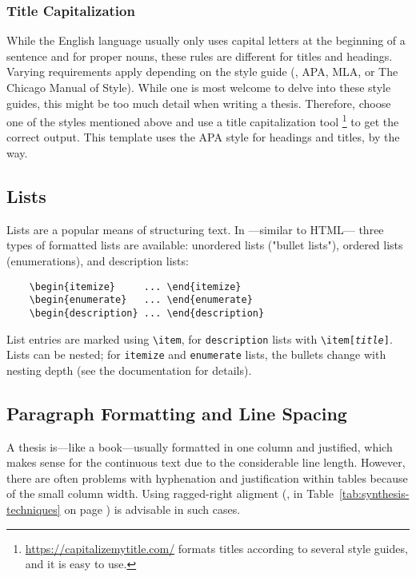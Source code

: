 \subsubsection{Title Capitalization}

While the English language usually only uses capital letters at the beginning of
a sentence and for proper nouns, these rules are different for titles and
headings. Varying requirements apply depending on the style guide (\eg, APA,
MLA, or The Chicago Manual of Style). While one is most welcome to delve into
these style guides, this might be too much detail when writing a thesis.
Therefore, choose one of the styles mentioned above and use a
title capitalization tool%
\footnote{\url{https://capitalizemytitle.com/} formats titles according to
several style guides, and it is easy to use.}
to get the correct output. This template uses the APA style for headings and
titles, by the way.

\subsection{Lists}

Lists are a popular means of structuring text. In \latex---similar to HTML---
three types of formatted lists are available: unordered lists ("bullet lists"),
ordered lists (enumerations), and description lists:
%
\begin{verbatim}
    \begin{itemize}     ... \end{itemize}
    \begin{enumerate}   ... \end{enumerate}
    \begin{description} ... \end{description}
\end{verbatim}
%
List entries are marked using \verb!\item!, for \texttt{description} lists with
\verb!\item[!\texttt{\em title}\verb!]!. Lists can be nested; for
\texttt{itemize} and \texttt{enumerate} lists, the bullets change with nesting
depth (see the \latex documentation for details).

\subsection{Paragraph Formatting and Line Spacing}

A thesis is---like a book---usually formatted in one column and justified, which
makes sense for the continuous text due to the considerable line length.
However, there are often problems with hyphenation and justification within
tables because of the small column width. Using ragged-right aligment (\eg, in
Table~\ref{tab:synthesis-techniques} on page \pageref{tab:synthesis-techniques})
is advisable in such cases.

